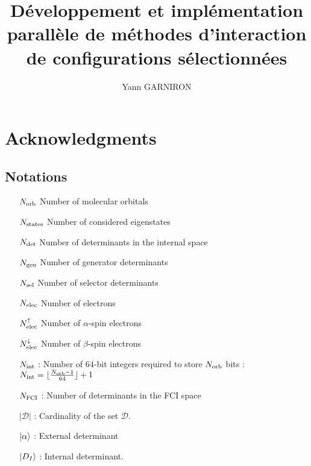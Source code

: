 \documentclass[12pt,a4paper]{report}
\title{Développement et implémentation parallèle de méthodes d'interaction de configurations sélectionnées}
\author{Yann GARNIRON}
\begin{document}
\dominitoc


\newpage

\chapter*{Acknowledgments}







\newpage

\tableofcontents
\newpage

\section*{Notations}

\begin{itemize}

\item [${N_\text{orb}}$] Number of molecular orbitals

\item [${N_\text{states}}$] Number of considered eigenstates

\item [${N_\text{det}}$] Number of determinants in the internal space

\item [${N_\text{gen}}$] Number of generator determinants 

\item [${N_\text{sel}}$] Number of selector determinants

\item [${N_\text{elec}}$] Number of electrons

\item [${N_\text{elec}^{\uparrow}}$] Number of $\alpha$-spin electrons

\item [${N_\text{elec}^{\downarrow}}$] Number of $\beta$-spin electrons

\item [${N_\text{int}}$] : Number of 64-bit integers required to store ${N_\text{orb}}$ bits : 
${{N_\text{int}} = \lfloor \frac{{N_\text{orb}}-1}{64} \rfloor + 1}$

%

\item [$N_\text{FCI}$] : Number of determinants in the FCI space

\item [$|\mathcal{D}|$] : Cardinality of the set $\mathcal{D}$.

\item [${\ket{\alpha}}$] : External determinant

\item [$\ket {D_I}$] : Internal determinant.
\end{itemize}
\end{document}
